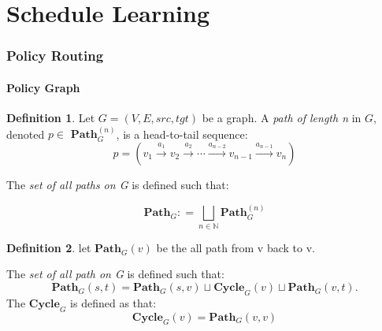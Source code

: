 \documentclass{article}
\theoremstyle{definition}
\newtheorem{definition}{Definition}[section]
\theoremstyle{remark}
\theoremstyle{theorem}
\theoremstyle{definition}
\newcommand{\path}[2]{\mathbf{Path}^{#2}_{#1}}
\newcommand{\pathall}[1]{\mathbf{Path}_{#1}}
\newcommand{\labeledarrow}[1]{\stackrel{#1}{\rightarrow}}
\newcommand{\cyclepath}[1]{\mathbf{Cycle}_{#1}}
\begin{document}
	
	\part{Schedule Learning}
	
	\section{Policy Routing}
	
	\subsection{Policy Graph}
	
	\begin{definition} 
		Let $G = (V, E, src, tgt)$ be a graph. A \emph{path of length n} in $G$, denoted $p \in$ $\path{G}{(n)}$, is a head-to-tail sequence:
		\[
		p = (v_{1}   \labeledarrow{a_{1}}   v_{2}   \labeledarrow{a_{2}}  \cdots   \labeledarrow{a_{n-2}}  v_{n-1}   \labeledarrow{a_{n-1}}   v_{n})
		\]
		
		The \emph{set of all paths on G} is defined such that: 
		
		\[
		\pathall{G} : = \bigsqcup_{n \in \mathbb{N}}{\path{G}{(n)}}
		\]
	\end{definition}
	


	\begin{definition}
			let $\pathall{G}(v)$ be the all path from v back to v.
			
			The \emph{set of all path on G} is defined such that:
			\[
			\pathall{G}(s,t) = \pathall{G}(s,v)\sqcup \cyclepath{G}(v) \sqcup \pathall{G}(v,t).
			\]
			The $\cyclepath{G}$ is defined as that:
			\[
			\cyclepath{G}(v) = \pathall{G}(v,v)
			\]
		

	\end{definition}
	
	
		
	
\end{document}
